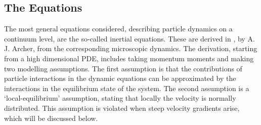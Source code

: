 \documentclass[11pt, a4paper]{article}
\theoremstyle{definition}
\begin{document}
\subsection{The Equations}
The most general equations considered, describing particle dynamics on a continuum level, are the so-called inertial equations. These are derived in \cite{Archer1}, by A. J. Archer, from the corresponding microscopic dynamics. The derivation, starting from a high dimensional PDE, includes taking momentum moments and making two modelling assumptions. The first assumption is that the contributions of particle interactions in the dynamic equations can be approximated by the interactions in the equilibrium state of the system. The second assumption is a `local-equilibrium' assumption, stating that locally the velocity is normally distributed. This assumption is violated when steep velocity gradients arise, which will be discussed below.
\end{document}

